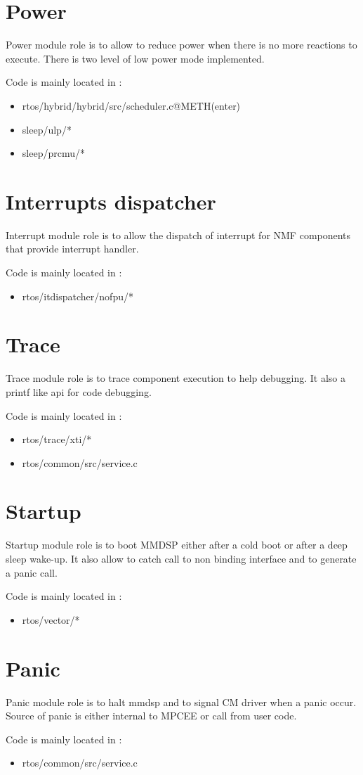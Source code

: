\section{Power}
Power module role is to allow to reduce power when there is no more reactions to
execute. There is two level of low power mode implemented.

Code is mainly located in :
\begin{itemize}
  \item rtos/hybrid/hybrid/src/scheduler.c@METH(enter)
  \item sleep/ulp/*
  \item sleep/prcmu/*
\end{itemize}

\section{Interrupts dispatcher}
Interrupt module role is to allow the dispatch of interrupt for NMF components
that provide interrupt handler.

Code is mainly located in :
\begin{itemize}
  \item rtos/itdispatcher/nofpu/*
\end{itemize}

\section{Trace}
Trace module role is to trace component execution to help debugging. It also a
printf like api for code debugging.

Code is mainly located in :
\begin{itemize}
  \item rtos/trace/xti/*
  \item rtos/common/src/service.c
\end{itemize}

\section{Startup}
Startup module role is to boot MMDSP either after a cold boot or after a deep
sleep wake-up. It also allow to catch call to non binding interface and to
generate a panic call.

Code is mainly located in :
\begin{itemize}
  \item rtos/vector/*
\end{itemize}

\section{Panic}
Panic module role is to halt mmdsp and to signal CM driver when a panic occur.
Source of panic is either internal to MPCEE or call from user code.

Code is mainly located in :
\begin{itemize}
  \item rtos/common/src/service.c
\end{itemize}
